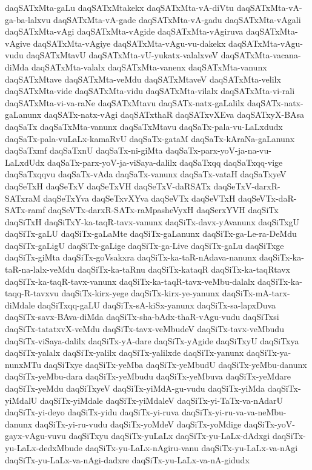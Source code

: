 {daqSATxMta-gaLu
daqSATxMtakekx
daqSATxMta-vA-diVtu
daqSATxMta-vA-ga-ba-lalxvu
daqSATxMta-vA-gade
daqSATxMta-vA-gadu
daqSATxMta-vAgali
daqSATxMta-vAgi
daqSATxMta-vAgide
daqSATxMta-vAgiruva
daqSATxMta-vAgive
daqSATxMta-vAgiye
daqSATxMta-vAgu-vu-dakekx
daqSATxMta-vAgu-vudu
daqSATxMtavU
daqSATxMta-vU-yukatx-valalxveV
daqSATxMta-vacana-diMda
daqSATxMta-valalx
daqSATxMta-vanenx
daqSATxMta-vanunx
daqSATxMtave
daqSATxMta-veMdu
daqSATxMtaveV
daqSATxMta-velilx
daqSATxMta-vide
daqSATxMta-vidu
daqSATxMta-vilalx
daqSATxMta-vi-rali
daqSATxMta-vi-va-raNe
daqSATxMtavu
daqSATx-natx-gaLalilx
daqSATx-natx-gaLanunx
daqSATx-natx-vAgi
daqSATxthaR
daqSATxvXEva
daqSATxyX-BAsa
daqSaTx
daqSaTxMta-vanunx
daqSaTxMtavu
daqSaTx-pala-vu-LaLxdudx
daqSaTx-pala-vuLaLx-kamaRvU
daqSaTx-gataM
daqSaTx-kAraNa-gaLanunx
daqSaTxmf
daqSaTxnU
daqSaTx-ni-giMta
daqSaTx-parx-yoV-ja-na-vu-LaLxdUdx
daqSaTx-parx-yoV-ja-viSaya-dalilx
daqSaTxqq
daqSaTxqq-vige
daqSaTxqqvu
daqSaTx-vAda
daqSaTx-vanunx
daqSaTx-vataH
daqSaTxyeV
daqSeTxH
daqSeTxV
daqSeTxVH
daqSeTxV-daRSATx
daqSeTxV-darxR-SATxraM
daqSeTxYva
daqSeTxvXYva
daqSeVTx
daqSeVTxH
daqSeVTx-daR-SATx-ramf
daqSeVTx-darxR-SATx-raMpasheVyxH
daqSerxYVH
daqSiTx
daqSiTxH
daqSiTxY-ka-taqR-tavx-vanunx
daqSiTx-davx-yAvanunx
daqSiTxgU
daqSiTx-gaLU
daqSiTx-gaLaMte
daqSiTx-gaLanunx
daqSiTx-ga-Le-ra-DeMdu
daqSiTx-gaLigU
daqSiTx-gaLige
daqSiTx-ga-Live
daqSiTx-gaLu
daqSiTxge
daqSiTx-giMta
daqSiTx-goVsakxra
daqSiTx-ka-taR-nAdava-nanunx
daqSiTx-ka-taR-na-lalx-veMdu
daqSiTx-ka-taRnu
daqSiTx-kataqR
daqSiTx-ka-taqRtavx
daqSiTx-ka-taqR-tavx-vanunx
daqSiTx-ka-taqR-tavx-veMbu-dalalx
daqSiTx-ka-taqq-R-tavxvu
daqSiTx-kirx-yege
daqSiTx-kirx-ye-yanunx
daqSiTx-mA-tarx-diMdale
daqSiTxqq-gaLU
daqSiTx-sA-kiSx-yanunx
daqSiTx-sa-lapxDuva
daqSiTx-savx-BAva-diMda
daqSiTx-sha-bAdx-thaR-vAgu-vudu
daqSiTxsi
daqSiTx-tatatxvX-veMdu
daqSiTx-tavx-veMbudeV
daqSiTx-tavx-veMbudu
daqSiTx-viSaya-dalilx
daqSiTx-yA-dare
daqSiTx-yAgide
daqSiTxyU
daqSiTxya
daqSiTx-yalalx
daqSiTx-yalilx
daqSiTx-yalilxde
daqSiTx-yanunx
daqSiTx-ya-nunxMTu
daqSiTxye
daqSiTx-yeMba
daqSiTx-yeMbudU
daqSiTx-yeMbu-danunx
daqSiTx-yeMbu-dara
daqSiTx-yeMbudu
daqSiTx-yeMbuva
daqSiTx-yeMdare
daqSiTx-yeMdu
daqSiTxyeV
daqSiTx-yiMdA-gu-vudu
daqSiTx-yiMda
daqSiTx-yiMdalU
daqSiTx-yiMdale
daqSiTx-yiMdaleV
daqSiTx-yi-TaTx-va-nAdarU
daqSiTx-yi-deyo
daqSiTx-yidu
daqSiTx-yi-ruva
daqSiTx-yi-ru-va-va-neMbu-danunx
daqSiTx-yi-ru-vudu
daqSiTx-yoMdeV
daqSiTx-yoMdige
daqSiTx-yoV-gayx-vAgu-vuvu
daqSiTxyu
daqSiTx-yuLaLx
daqSiTx-yu-LaLx-dAdxgi
daqSiTx-yu-LaLx-dedxMbude
daqSiTx-yu-LaLx-nAgiru-vanu
daqSiTx-yu-LaLx-va-nAgi
daqSiTx-yu-LaLx-va-nAgi-dadxre
daqSiTx-yu-LaLx-va-nA-gidudx
}
